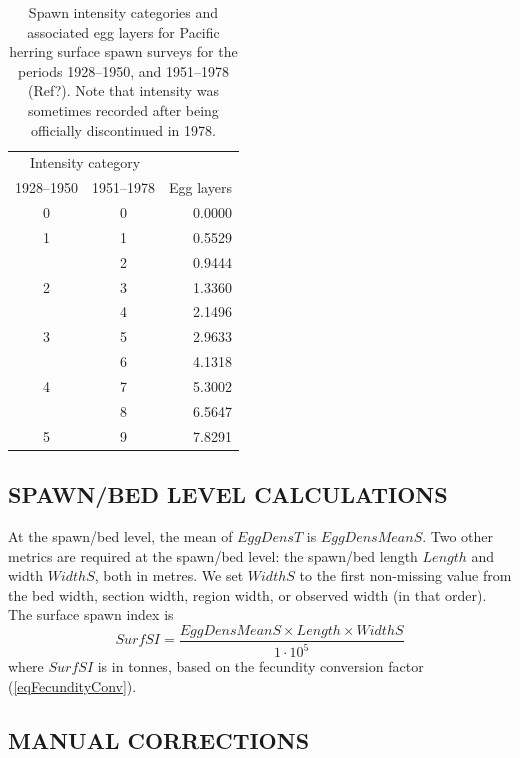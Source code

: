 \documentclass[12pt]{article}
\begin{document}
\begin{table}
\centering
\caption[Spawn intensity categories and associated egg layers for Pacific herring surface spawn surveys]
{Spawn intensity categories and associated egg layers for Pacific herring surface spawn surveys for the periods 1928--1950, and 1951--1978 (Ref?).
Note that intensity was sometimes recorded after being officially discontinued in 1978.}
\begin{tabular}{ccr}
\toprule
\multicolumn{2}{c}{Intensity category} & \\
1928--1950 & 1951--1978 & Egg layers\\
\midrule
0 & 0 & 0.0000 \\
1 & 1 & 0.5529 \\
 & 2 & 0.9444 \\
2 & 3 & 1.3360 \\
 & 4 & 2.1496 \\
3 & 5 & 2.9633 \\
 & 6 & 4.1318 \\
4 & 7 & 5.3002 \\
 & 8 & 6.5647 \\
5 & 9 & 7.8291 \\
\bottomrule
\end{tabular}
\label{tabIntensity}
\end{table}

\subsection{SPAWN/BED LEVEL CALCULATIONS}

At the spawn/bed level, the mean of $EggDensT$ is $EggDensMeanS$.
Two other metrics are required at the spawn/bed level: the spawn/bed length $Length$ and width $WidthS$, both in metres.
We set $WidthS$ to the first non-missing value from the bed width, section width, region width, or observed width (in that order).
The surface spawn index is
\begin{equation}
SurfSI = \frac{EggDensMeanS \times Length \times WidthS} {1 \cdot 10^{5}}
\label{eqBiomassSurf}
\end{equation}
where $SurfSI$ is in tonnes, based on the fecundity conversion factor (\autoref{eqFecundityConv}).

\subsection{MANUAL CORRECTIONS}
\end{document}
